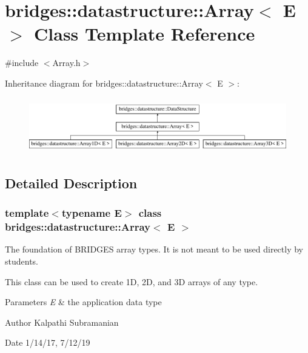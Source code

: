 \hypertarget{classbridges_1_1datastructure_1_1_array}{}\section{bridges\+::datastructure\+::Array$<$ E $>$ Class Template Reference}
\label{classbridges_1_1datastructure_1_1_array}


{\ttfamily \#include $<$Array.\+h$>$}

Inheritance diagram for bridges\+::datastructure\+::Array$<$ E $>$\+:\begin{figure}[H]
\begin{center}
\leavevmode
\includegraphics[height=2.445415cm]{classbridges_1_1datastructure_1_1_array}
\end{center}
\end{figure}


\subsection{Detailed Description}
\subsubsection*{template$<$typename E$>$\newline
class bridges\+::datastructure\+::\+Array$<$ E $>$}

The foundation of B\+R\+I\+D\+G\+ES array types. It is not meant to be used directly by students. 

This class can be used to create 1D, 2D, and 3D arrays of any type.


\begin{DoxyParams}{Parameters}
{\em E} & the application data type\\
\hline
\end{DoxyParams}
\begin{DoxyAuthor}{Author}
Kalpathi Subramanian 
\end{DoxyAuthor}
\begin{DoxyDate}{Date}
1/14/17, 7/12/19 
\end{DoxyDate}
